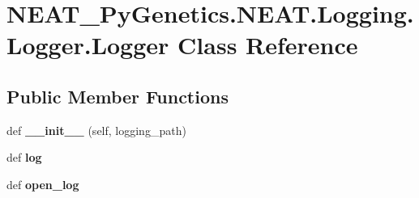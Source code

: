 \hypertarget{class_n_e_a_t___py_genetics_1_1_n_e_a_t_1_1_logging_1_1_logger_1_1_logger}{}\section{N\+E\+A\+T\+\_\+\+Py\+Genetics.\+N\+E\+A\+T.\+Logging.\+Logger.\+Logger Class Reference}
\label{class_n_e_a_t___py_genetics_1_1_n_e_a_t_1_1_logging_1_1_logger_1_1_logger}
\subsection*{Public Member Functions}
\begin{DoxyCompactItemize}
\item 
def {\bfseries \+\_\+\+\_\+init\+\_\+\+\_\+} (self, logging\+\_\+path)\hypertarget{class_n_e_a_t___py_genetics_1_1_n_e_a_t_1_1_logging_1_1_logger_1_1_logger_a858ce7abb17975fcefb7f106aa4413fa}{}\label{class_n_e_a_t___py_genetics_1_1_n_e_a_t_1_1_logging_1_1_logger_1_1_logger_a858ce7abb17975fcefb7f106aa4413fa}

\item 
def {\bfseries log}\hypertarget{class_n_e_a_t___py_genetics_1_1_n_e_a_t_1_1_logging_1_1_logger_1_1_logger_acaf6c6a388e2aeceb191e6416431ef97}{}\label{class_n_e_a_t___py_genetics_1_1_n_e_a_t_1_1_logging_1_1_logger_1_1_logger_acaf6c6a388e2aeceb191e6416431ef97}

\item 
def {\bfseries open\+\_\+log}\hypertarget{class_n_e_a_t___py_genetics_1_1_n_e_a_t_1_1_logging_1_1_logger_1_1_logger_a4fd31c2e55ff5ec5710a96a86515f825}{}\label{class_n_e_a_t___py_genetics_1_1_n_e_a_t_1_1_logging_1_1_logger_1_1_logger_a4fd31c2e55ff5ec5710a96a86515f825}

\end{DoxyCompactItemize}
